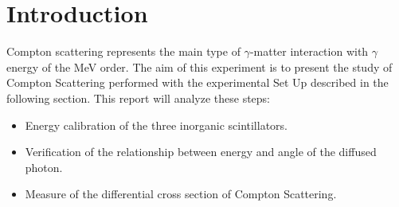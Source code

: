 \section*{Introduction}

Compton scattering represents the main  type of $\gamma$-matter interaction with $\gamma$ energy of the MeV order.   
The aim of this experiment is to present the study of Compton Scattering performed with the experimental Set Up described in the following section.
This report will analyze these steps:
\begin{itemize}
	\item Energy calibration of the three inorganic scintillators.
	\item Verification of the relationship between energy and angle of the diffused photon.
	\item Measure of the differential cross section of Compton Scattering.
\end{itemize}
